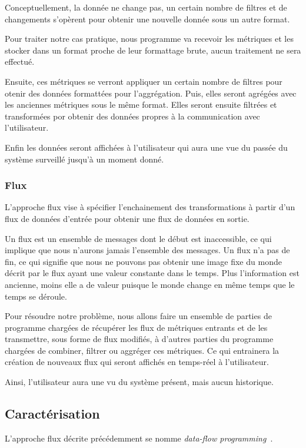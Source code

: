 \documentclass{article}
\begin{document}
Conceptuellement, la donnée ne change pas, un certain nombre de filtres et de
changements s'opèrent pour obtenir une nouvelle donnée sous un autre format.

Pour traiter notre cas pratique, nous programme va recevoir les métriques et
les stocker dans un format proche de leur formattage brute, aucun traitement
ne sera effectué.

Ensuite, ces métriques se verront appliquer un certain nombre de filtres pour
otenir des données formattées pour l'aggrégation.
Puis, elles seront agrégées avec les anciennes métriques sous le même format.
Elles seront ensuite filtrées et transformées por obtenir des données propres à
la communication avec l'utilisateur.

Enfin les données seront affichées à l'utilisateur qui aura une vue du passée du
système surveillé jusqu'à un moment donné.

\subsubsection{Flux}
L'approche flux vise à spécifier l'enchainement des transformations à partir
d'un flux de données d'entrée pour obtenir une flux de données en sortie.

Un flux est un ensemble de messages dont le début est inaccessible, ce qui
implique que nous n'aurons jamais l'ensemble des messages.
Un flux n'a pas de fin, ce qui signifie que nous ne pouvons pas obtenir une
image fixe du monde décrit par le flux ayant une valeur constante dans le temps.
Plus l'information est ancienne, moins elle a de valeur puisque le monde change
en même temps que le temps se déroule.

Pour résoudre notre problème, nous allons faire un ensemble de parties de programme
chargées de récupérer les flux de métriques entrants et de les transmettre,
sous forme de flux modifiés, à d'autres parties du programme chargées de combiner,
filtrer ou aggréger ces métriques.
Ce qui entrainera la création de nouveaux flux qui seront affichés en temps-réel
à l'utilisateur.

Ainsi, l'utilisateur aura une vu du système présent, mais aucun historique.

\subsection{Caractérisation}
L'approche flux décrite précédemment se nomme \emph{data-flow programming}~\cite{dataflow}.
\end{document}
